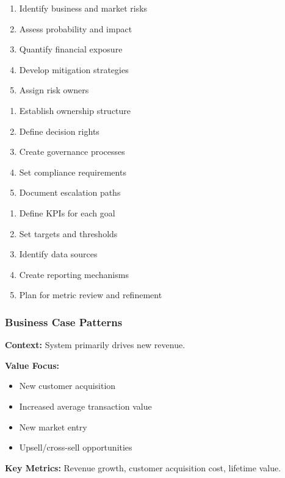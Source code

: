 \documentclass[11pt,letterpaper]{article}
\begin{document}
\begin{guidancebox}
\begin{enumerate}[nosep]
    \item Identify business and market risks
    \item Assess probability and impact
    \item Quantify financial exposure
    \item Develop mitigation strategies
    \item Assign risk owners
\end{enumerate}
\end{guidancebox}

\begin{guidancebox}
\begin{enumerate}[nosep]
    \item Establish ownership structure
    \item Define decision rights
    \item Create governance processes
    \item Set compliance requirements
    \item Document escalation paths
\end{enumerate}
\end{guidancebox}

\begin{guidancebox}
\begin{enumerate}[nosep]
    \item Define KPIs for each goal
    \item Set targets and thresholds
    \item Identify data sources
    \item Create reporting mechanisms
    \item Plan for metric review and refinement
\end{enumerate}
\end{guidancebox}

\subsubsection{Business Case Patterns}

\begin{patternbox}
\textbf{Context:} System primarily drives new revenue.

\textbf{Value Focus:}
\begin{itemize}[nosep]
    \item New customer acquisition
    \item Increased average transaction value
    \item New market entry
    \item Upsell/cross-sell opportunities
\end{itemize}

\textbf{Key Metrics:} Revenue growth, customer acquisition cost, lifetime value.
\end{patternbox}
\end{document}
